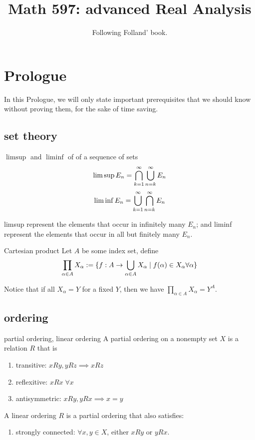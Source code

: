 \documentclass[lang=cn,11pt]{elegantbook}
\title{Math 597: advanced Real Analysis}
\subtitle{Following Folland' book.}
\begin{document}
\frontmatter
\tableofcontents
\mainmatter



\chapter*{Prologue}
\noindent In this Prologue, we will only state important prerequisites that we should know without proving them, for the sake of time saving.
\section{set theory}
\begin{definition}{$\limsup$ and $\liminf$ of of a sequence of sets}
$$
\limsup E_n = \bigcap_{k=1}^\infty \bigcup_{n=k}^\infty E_n
$$
$$
\liminf E_n = \bigcup_{k=1}^\infty \bigcap_{n=k}^\infty E_n
$$
\end{definition}
limsup represent the elements that occur in infinitely many $E_n$; and liminf represent the elements that occur in all but finitely many $E_n$.


    
\begin{definition}{Cartesian product}
Let $A$ be some index set, define
    $$
    \prod_{\alpha \in A} X_\alpha := \{ f: A\rightarrow \bigcup_{\alpha \in A} X_\alpha \mid f(\alpha) \in X_\alpha \forall \alpha   \}
    $$
\end{definition}
Notice that if all $X_\alpha = Y$ for a fixed $Y$, then we have $\prod_{\alpha \in A} X_\alpha = Y^A$.

\section{ordering}
\begin{definition}{partial ordering, linear ordering}
    A partial ordering on a nonempty set $X$ is a relation $R$ that is 
    \begin{enumerate}
        \item transitive: $xRy, yRz \implies xRz$
        \item reflexitive: $xRx \; \forall x$
        \item antisymmetric: $xRy,yRx \implies x=y$
    \end{enumerate}
    A linear ordering $R$ is a partial ordering that also satisfies:
    \begin{enumerate}[resume]
        \item strongly connected: $\forall x,y \in X$, either $xRy$ or $yRx$.
    \end{enumerate}
\end{definition}
\end{document}
